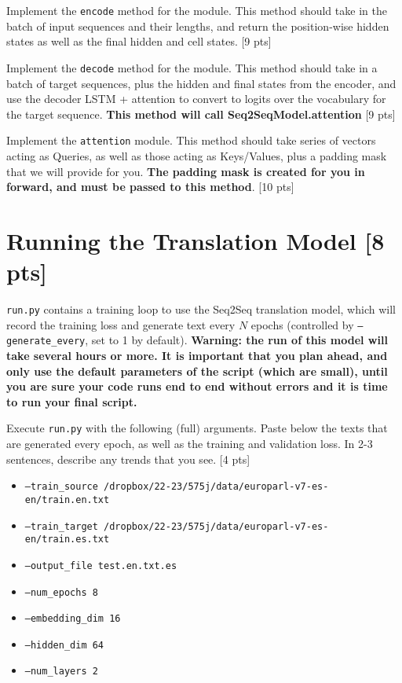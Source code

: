 \documentclass[11pt]{article}
\begin{document}
\vspace{2em}
 Implement the \texttt{encode} method for the module. This method should take in the batch of input sequences and their lengths, and return the position-wise hidden states as well as the final hidden and cell states. \hfill [9 pts]

\vspace{2em}
 Implement the \texttt{decode} method for the module. This method should take in a batch of target sequences, plus the hidden and final states from the encoder, and use the decoder LSTM + attention to convert to logits over the vocabulary for the target sequence. \textbf{This method will call Seq2SeqModel.attention} \hfill [9 pts]

\vspace{2em}
 Implement the \texttt{attention} module. This method should take series of vectors acting as Queries, as well as those acting as Keys/Values, plus a padding mask that we will provide for you. \textbf{The padding mask is created for you in forward, and must be passed to this method}. \hfill [10 pts]

\section{Running the Translation Model [8 pts]}

\texttt{run.py} contains a training loop to use the Seq2Seq translation model, which will record the training loss and generate text every $N$ epochs (controlled by \texttt{--generate\_every}, set to 1 by default). \textbf{Warning: the run of this model will take several hours or more. It is important that you plan ahead, and only use the default parameters of the script (which are small), until you are sure your code runs end to end without errors and it is time to run your final script.}

\vspace{2em}
  Execute \texttt{run.py} with the following (full) arguments. Paste below the texts that are generated every epoch, as well as the training and validation loss.  In 2-3 sentences, describe any trends that you see. \hfill [4 pts]
\begin{itemize}
    \item \texttt{--train\_source /dropbox/22-23/575j/data/europarl-v7-es-en/train.en.txt}
    \item \texttt{--train\_target /dropbox/22-23/575j/data/europarl-v7-es-en/train.es.txt}
    \item \texttt{--output\_file test.en.txt.es}
    \item \texttt{--num\_epochs 8}
    \item \texttt{--embedding\_dim 16}
    \item \texttt{--hidden\_dim 64}
    \item \texttt{--num\_layers 2}
\end{itemize}
\end{document}

